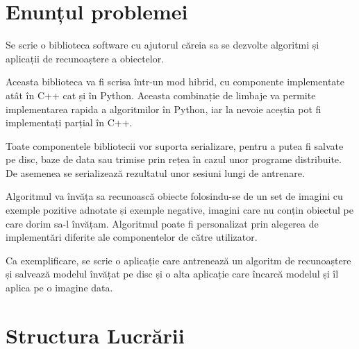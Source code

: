 













\section{Enunțul problemei}
Se scrie o biblioteca software cu ajutorul căreia sa se dezvolte algoritmi și aplicații de recunoaștere a obiectelor.

Aceasta biblioteca va fi scrisa într-un mod hibrid, cu componente implementate atât în C++ cat și în Python.
Aceasta combinație de limbaje va permite implementarea rapida a algoritmilor în Python, iar la nevoie aceștia pot fi implementați parțial în C++.

Toate componentele bibliotecii vor suporta serializare, pentru a putea fi salvate pe disc, baze de data sau trimise prin rețea în cazul unor programe distribuite.
De asemenea se serializează rezultatul unor sesiuni lungi de antrenare.

Algoritmul va învăța sa recunoască obiecte folosindu-se de un set de imagini cu exemple pozitive adnotate și exemple negative, imagini care nu conțin obiectul pe care dorim sa-l învățam.
Algoritmul poate fi personalizat prin alegerea de implementări diferite ale componentelor de către utilizator.

Ca exemplificare, se scrie o aplicație care antrenează un algoritm de recunoaștere și salvează modelul învățat pe disc și o alta aplicație care încarcă modelul și îl aplica pe o imagine data.



\section{Structura Lucrării}


